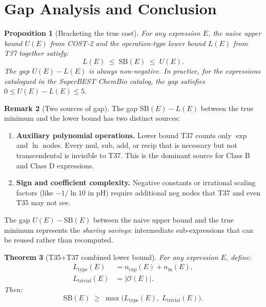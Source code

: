 \documentclass[12pt,a4paper]{article}
\newtheorem{theorem}{Theorem}[section]
\newtheorem{proposition}[theorem]{Proposition}
\theoremstyle{definition}
\newtheorem{remark}[theorem]{Remark}
\newcommand{\SB}{\mathrm{SB}}
\begin{document}
\section{Gap Analysis and Conclusion}\label{sec:gap}

\begin{proposition}[Bracketing the true cost]\label{prop:bracket}
For any expression $E$, the naive upper bound $U(E)$ from COST-2 and the
operation-type lower bound $L(E)$ from T37 together satisfy:
\[
  L(E) \;\leq\; \SB(E) \;\leq\; U(E).
\]
The gap $U(E) - L(E)$ is always non-negative.  In practice, for the
expressions catalogued in the SuperBEST ChemBio catalog, the gap satisfies
$0 \leq U(E) - L(E) \leq 5$.
\end{proposition}

\begin{remark}[Two sources of gap]\label{rem:gapsources}
The gap $\SB(E) - L(E)$ between the true minimum and the lower bound has two
distinct sources:
\begin{enumerate}
  \item \textbf{Auxiliary polynomial operations.}
        Lower bound T37 counts only $\exp$ and $\ln$ nodes.  Every mul, sub,
        add, or recip that is necessary but not transcendental is invisible to
        T37.  This is the dominant source for Class B and Class D expressions.
  \item \textbf{Sign and coefficient complexity.}
        Negative constants or irrational scaling factors (like $-1/\ln 10$ in pH)
        require additional neg nodes that T37 and even T35 may not see.
\end{enumerate}
The gap $U(E) - \SB(E)$ between the naive upper bound and the true minimum
represents the \emph{sharing savings}: intermediate sub-expressions that can
be reused rather than recomputed.
\end{remark}

\begin{theorem}[T35+T37 combined lower bound]\label{thm:combined}
For any expression $E$, define:
\begin{align*}
  L_{\mathrm{type}}(E) &= n_{\exp}(E) + n_{\ln}(E), \\
  L_{\mathrm{trivial}}(E) &= |\mathcal{O}(E)|.
\end{align*}
Then:
\[
  \SB(E) \;\geq\; \max\!\bigl(L_{\mathrm{type}}(E),\; L_{\mathrm{trivial}}(E)\bigr).
\]
\end{theorem}
\end{document}
